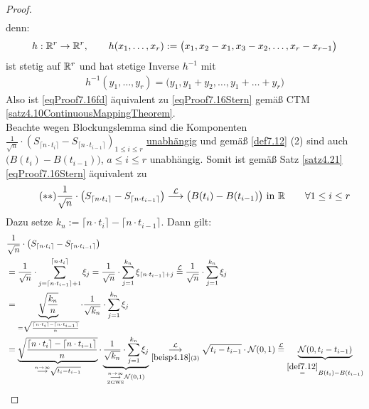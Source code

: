 \begin{proof}
\begin{align}
\end{align}
denn:
\begin{align*}
h:\mathbb{R}^r\to\mathbb{R}^r,\qquad h(x_1,\ldots,x_r):=\big(x_1,x_2-x_1,x_3-x_2,\ldots,x_r-x_{r-1}\big)
\end{align*}
ist stetig auf $\mathbb{R}^r$ und hat stetige Inverse $h^{-1}$ mit 
\begin{align*}
h^{-1}(y_1,\ldots,y_r)=\big(y_1,y_1+y_2,\ldots,y_1+\ldots+y_r\big)
\end{align*}
Also ist \eqref{eqProof7.16fd} äquivalent zu \eqref{eqProof7.16Stern} gemäß CTM \ref{satz4.10ContinuousMappingTheorem}.\\
Beachte wegen Blockungslemma sind die Komponenten $\frac{1}{\sqrt{n}}\cdot\left(S_{\lceil n\cdot t_i\rceil}-S_{\lceil n\cdot t_{i-1}\rceil}\right)_{1\leq i\leq r}$ \underline{unabhängig} und gemäß \ref{def7.12} (2) sind auch $\big(B(t_i)-B(t_{i-1})\big)$, $a\leq i\leq r$ unabhängig. Somit ist gemäß Satz \ref{satz4.21} \eqref{eqProof7.16Stern} äquivalent zu 
\begin{align}\label{eqProof7.16SternStern}\tag{$\ast\ast$}
\frac{1}{\sqrt{n}}\cdot\left(S_{\lceil n\cdot t_i\rceil}-S_{\lceil n\cdot t_{i-1}\rceil}\right)
\stackrel{\mathcal{L}}{\longrightarrow}
\big(B(t_i)-B(t_{i-1})\big)\text{ in }\mathbb{R}\qquad\forall 1\leq i\leq r
\end{align}
Dazu setze $k_n:=\lceil n\cdot t_i\rceil-\lceil n\cdot t_{i-1}\rceil$. Dann gilt:
\begin{align*}
&\frac{1}{\sqrt{n}}\cdot\left(S_{\lceil n\cdot t_i\rceil}-S_{\lceil n\cdot t_{i-1}\rceil}\right)\\
&=\frac{1}{\sqrt{n}}\cdot\sum\limits_{j=\lceil n\cdot t_{i-1}\rceil+1}^{\lceil n\cdot t_i\rceil}\xi_j
=\frac{1}{\sqrt{n}}\cdot\sum\limits_{j=1}^{k_n}\xi_{\lceil n\cdot t_{i-1}\rceil+j}
\overset{\L}{=}
\frac{1}{\sqrt{n}}\cdot\sum\limits_{j=1}^{k_n}\xi_j\\
&=\underbrace{\sqrt{\frac{k_n}{n}}}_{=\sqrt{\frac{\lceil n\cdot t_i\rceil-\lceil n\cdot t_{i-1}\rceil}{n}}}\cdot\frac{1}{\sqrt{k_n}}\cdot\sum\limits_{j=1}^{k_n}\xi_j\\
&=\underbrace{\sqrt{\frac{\lceil n\cdot t_i\rceil-\lceil n\cdot t_{i-1}\rceil}{n}}}_{\stackrel{n\to\infty}{\longrightarrow}\sqrt{t_i-t_{i-1}}}\cdot\underbrace{\frac{1}{\sqrt{k_n}}\cdot\sum\limits_{j=1}^{k_n}\xi_j}_{\stackrelnew{\text{ZGWS}}{n\to\infty}{\longrightarrow}\mathcal{N}(0,1)}\stackrelnew{\ref{beisp4.18}(3)}{\L}{\longrightarrow}\sqrt{t_i-t_{i-1}}\cdot\mathcal{N}(0,1)
\overset{\L}{=}\underbrace{\mathcal{N}(0,t_i-t_{i-1})}_{
\overset{\ref{def7.12}}{=}B(t_i)-B(t_{i-1})}

\end{align*}
\end{proof}
